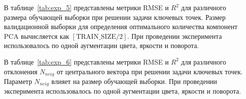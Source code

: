 \documentclass[a4paper,14pt]{article}
\begin{document}
\begin{landscape}
\begin{table}[H]
    \end{table}

	В таблице~\ref{tab:exp_5}  представлены метрики RMSE и $R^2$ для различного размера обучающей выборки при решении задачи ключевых точек. Размер валидационной выборки для определения оптимального количества компонент PCA вычисляется как $[\text{TRAIN\_SIZE} / 2]$. При проведении эксперимента использовалось по одной аугментации цвета, яркости и поворота.
	
	В таблице~\ref{tab:exp_6} представлены метрики RMSE и $R^2$ для различного отклонения $N_{neig}$ от центрального вектора при решении задачи ключевых точек. Параметр $N_{neig}$ влияет на размер обучающей выборки. При проведении эксперимента использовалось по одной аугментации цвета, яркости и поворота.

    \end{landscape}
\end{document}

